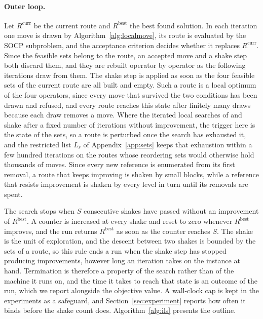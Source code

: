 \documentclass[11pt]{article}
\newcommand{\Rcurr}{R^{\mathrm{curr}}}   %
\newcommand{\Rbest}{R^{\mathrm{best}}}   %
\begin{document}
\paragraph{Outer loop.}
Let $\Rcurr$ be the current route and $\Rbest$ the best found solution. In each iteration one move is drawn by Algorithm~\ref{alg:localmove}, its route is evaluated by the SOCP subproblem, and the acceptance criterion decides whether it replaces $\Rcurr$. Since the feasible sets belong to the route, an accepted move and a shake step both discard them, and they are rebuilt operator by operator as the following iterations draw from them. The shake step is applied as soon as the four feasible sets of the current route are all built and empty. Such a route is a local optimum of the four operators, since every move that survived the two conditions has been drawn and refused, and every route reaches this state after finitely many draws because each draw removes a move. Where the iterated local searches of \citep{vansteenwegen2009iterated} and \citep{gunawan2015iterated} shake after a fixed number of iterations without improvement, the trigger here is the state of the sets, so a route is perturbed once the search has exhausted it, and the restricted list $L_r$ of Appendix~\ref{app:sets} keeps that exhaustion within a few hundred iterations on the routes whose reordering sets would otherwise hold thousands of moves. Since every new reference is enumerated from its first removal, a route that keeps improving is shaken by small blocks, while a reference that resists improvement is shaken by every level in turn until its removals are spent.

The search stops when $S$ consecutive shakes have passed without an improvement of $\Rbest$. A counter is increased at every shake and reset to zero whenever $\Rbest$ improves, and the run returns $\Rbest$ as soon as the counter reaches $S$. The shake is the unit of exploration, and the descent between two shakes is bounded by the sets of a route, so this rule ends a run when the shake step has stopped producing improvements, however long an iteration takes on the instance at hand. Termination is therefore a property of the search rather than of the machine it runs on, and the time it takes to reach that state is an outcome of the run, which we report alongside the objective value. A wall-clock cap is kept in the experiments as a safeguard, and Section~\ref{sec:experiment} reports how often it binds before the shake count does. Algorithm~\ref{alg:ils} presents the outline.
\end{document}
